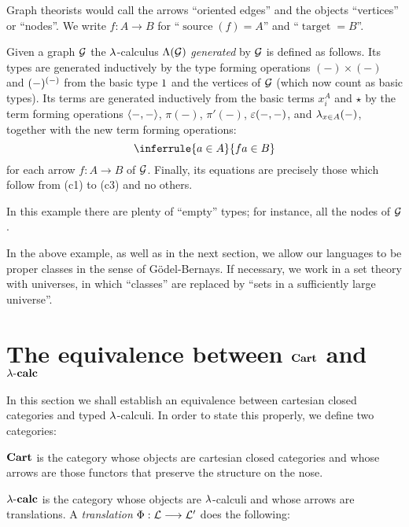 \begin{center}
\end{center}

Graph theorists would call the arrows ``oriented edges'' and the objects
``vertices'' or ``nodes''. We write $f: A \to B$ for ``$\mathop\text{source}(f) = A$'' and
``$\mathop{\text{target}(f)} = B$''.

\begin{example}
Given a graph $\cal G$ the $\lambda$-calculus $\Lambda(\cal G)$ {\em generated} by $\cal G$
is defined as follows. Its types are generated inductively by the type forming
operations $(-)\times(-)$ and $(-)^{(-)}$ from the basic type $1$
and the vertices of $\cal G$ (which now count as basic types).
Its terms are generated inductively
from the basic terms $x_i^A$ and $\star$ by the term forming operations
$\langle -,-\rangle$, $\pi(-)$, $\pi'(-)$, $\varepsilon(-,-)$, and $\lambda_{x\in A}(-)$,
together with the new term forming operations:
\[
\inferrule{a \in A}{f a \in B}
\]
for each arrow $f: A \to B$ of $\cal G$. Finally, its equations are precisely those
which follow from (c1) to (c3) and no others.

In this example there are plenty of ``empty'' types; for instance, all the
nodes of $\cal G$.
\end{example}
In the above example, as well as in the next section, we allow our
languages to be proper classes in the sense of G\"odel-Bernays. If necessary,
we work in a set theory with universes, in which ``classes'' are replaced by
``sets in a sufficiently large universe''.


\section{The equivalence between $\text{\bf Cart}$ and $\lambda\text{-{\bf{\kern 0.2pt}calc}}$}

In this section we shall establish an equivalence between cartesian closed
categories and typed $\lambda$-calculi. In order to state this properly, we define
two categories:

$\text{\bf Cart}$ is the category whose objects are cartesian closed categories and
whose arrows are those functors that preserve the structure on the nose.

$\lambda\text{-{\bf{\kern 0.2pt}calc}}$ is the category whose objects are $\lambda$-calculi and whose arrows are
{translations}. A {\em translation} $\Phi: {\mathcal L} \longrightarrow {\mathcal L}'$ does the following:

